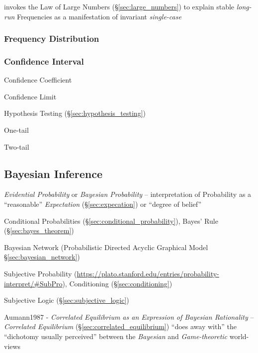 invokes the Law of Large Numbers (\S\ref{sec:large_numbers}) to explain stable
\emph{long-run} Frequencies as a manifestation of invariant \emph{single-case}



\subsubsection{Frequency Distribution}\label{sec:frequency_distribution}

\subsubsection{Confidence Interval}\label{sec:confidence_interval}

Confidence Coefficient

Confidence Limit

Hypothesis Testing (\S\ref{sec:hypothesis_testing})

One-tail

Two-tail



\subsection{Bayesian Inference}\label{sec:bayesian_inference}

\emph{Evidential Probability} or \emph{Bayesian Probability} -- interpretation
of Probability as a ``reasonable'' \emph{Expectation} (\S\ref{sec:expecation})
or ``degree of belief''

Conditional Probabilities (\S\ref{sec:conditional_probability}), Bayes' Rule
(\S\ref{sec:bayes_theorem})

\fist Bayesian Network (Probabilistic Directed Acyclic Graphical Model
\S\ref{sec:bayesian_network})

Subjective Probability
(\url{https://plato.stanford.edu/entries/probability-interpret/#SubPro}),
Conditioning (\S\ref{sec:conditioning})

\fist Subjective Logic (\S\ref{sec:subjective_logic})

\fist Aumann1987 - \emph{Correlated Equilibrium as an Expression of Bayesian
  Rationality} -- \emph{Correlated Equilibrium}
(\S\ref{sec:correlated_equilibrium}) ``does away with'' the ``dichotomy usually
perceived'' between the \emph{Bayesian} and \emph{Game-theoretic} world-views



